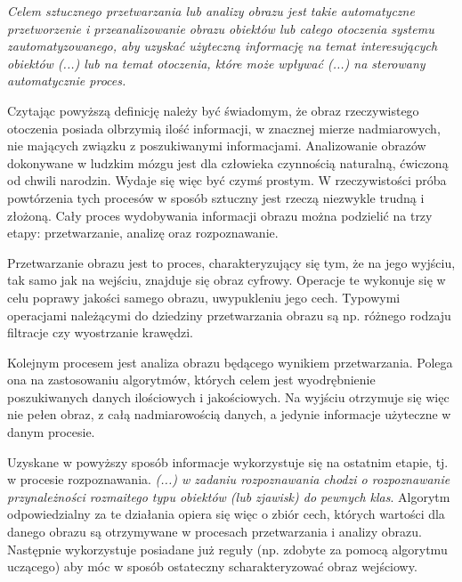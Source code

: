 \textit{Celem sztucznego przetwarzania lub analizy obrazu jest takie automatyczne przetworzenie i przeanalizowanie obrazu obiektów lub całego otoczenia systemu zautomatyzowanego, aby uzyskać użyteczną informację na temat interesujących obiektów (...) lub na temat otoczenia, które może wpływać (...) na sterowany automatycznie proces.}\cite{Tadeusiewicz}

Czytając powyższą definicję należy być świadomym, że obraz rzeczywistego otoczenia posiada olbrzymią ilość informacji, w znacznej mierze nadmiarowych, nie mających związku z poszukiwanymi informacjami. Analizowanie obrazów dokonywane w ludzkim mózgu jest dla człowieka czynnością naturalną, ćwiczoną od chwili narodzin. Wydaje się więc być czymś prostym. W rzeczywistości próba powtórzenia tych procesów w sposób sztuczny jest rzeczą niezwykle trudną i złożoną. Cały proces wydobywania informacji obrazu można podzielić na trzy etapy: przetwarzanie, analizę oraz rozpoznawanie.

Przetwarzanie obrazu jest to proces, charakteryzujący się tym, że na jego wyjściu, tak samo jak na wejściu, znajduje się obraz cyfrowy. Operacje te wykonuje się w celu poprawy jakości samego obrazu, uwypukleniu jego cech. Typowymi operacjami należącymi do dziedziny przetwarzania obrazu są np. różnego rodzaju filtracje czy wyostrzanie krawędzi.

Kolejnym procesem jest analiza obrazu będącego wynikiem przetwarzania. Polega ona na zastosowaniu algorytmów, których celem jest wyodrębnienie poszukiwanych danych ilościowych i jakościowych. Na wyjściu otrzymuje się więc nie pełen obraz, z całą nadmiarowością danych, a jedynie informacje użyteczne w danym procesie.

Uzyskane w powyższy sposób informacje wykorzystuje się na ostatnim etapie, tj. w procesie rozpoznawania. \textit{(...) w zadaniu rozpoznawania chodzi o rozpoznawanie przynależności rozmaitego typu obiektów (lub zjawisk) do pewnych klas}\cite{Tadeusiewicz_flasinski}. Algorytm odpowiedzialny za te działania opiera się więc o zbiór cech, których wartości dla danego obrazu są otrzymywane w procesach przetwarzania i analizy obrazu. Następnie wykorzystuje posiadane już reguły (np. zdobyte za pomocą algorytmu uczącego) aby móc w sposób ostateczny scharakteryzować obraz wejściowy.
